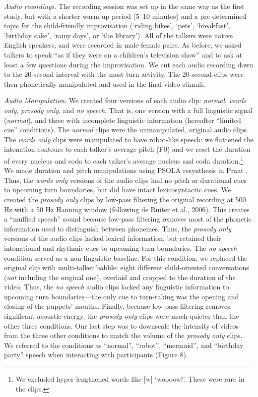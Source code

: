 \documentclass[authoryear, 12pt]{elsarticle}
\begin{document}
\textit{Audio recordings}. The recording session was set up in the same way as the first study, but with a shorter warm up period (5--10 minutes) and a pre-determined topic for the child-friendly improvisation (`riding bikes', `pets', `breakfast', `birthday cake', `rainy days', or `the library'). All of the talkers were native English speakers, and were recorded in male-female pairs. As before, we asked talkers to speak ``as if they were on a children's television show'' and to ask at least a few questions during the improvisation. We cut each audio recording down to the 20-second interval with the most turn activity. The 20-second clips were then phonetically manipulated and used in the final video stimuli.

\textit{Audio Manipulation}. We created four versions of each audio clip: \textit{normal}, \textit{words only}, \textit{prosody only}, and \textit{no speech}. That is, one version with a full linguistic signal (\textit{normal}), and three with incomplete linguistic information (hereafter ``limited cue'' conditions). The \textit{normal} clips were the unmanipulated, original audio clips. The \textit{words only} clips were manipulated to have robot-like speech: we flattened the intonation contours to each talker's average pitch (F0) and we reset the duration of every nucleus and coda to each talker's average nucleus and coda duration.\footnote{We excluded hyper-lengthened words like [w] `woooow!'. These were rare in the clips.} We made duration and pitch manipulations using PSOLA resynthesis in Praat \citep{Praat}. Thus, the \textit{words only} versions of the audio clips had no pitch or durational cues to upcoming turn boundaries, but did have intact lexicosyntactic cues. We created the \textit{prosody only} clips by low-pass filtering the original recording at 500 Hz with a 50 Hz Hanning window (following de Ruiter et al., 2006). This creates a ``muffled speech'' sound because low-pass filtering removes most of the phonetic information used to distinguish between phonemes. Thus, the \textit{prosody only} versions of the audio clips lacked lexical information, but retained their intonational and rhythmic cues to upcoming turn boundaries. The \textit{no speech} condition served as a non-linguistic baseline. For this condition, we replaced the original clip with multi-talker babble: eight different child-oriented conversations (\textit{not} including the original one), overlaid and cropped to the duration of the video. Thus, the \textit{no speech} audio clips lacked any linguistic information to upcoming turn boundaries---the only cue to turn-taking was the opening and closing of the puppets' mouths. Finally, because low-pass filtering removes significant acoustic energy, the \textit{prosody only} clips were much quieter than the other three conditions. Our last step was to downscale the intensity of videos from the three other conditions to match the volume of the \textit{prosody only} clips. We referred to the conditions as ``normal'', ``robot'', ``mermaid'', and ``birthday party'' speech when interacting with participants (Figure 8).
\end{document}
